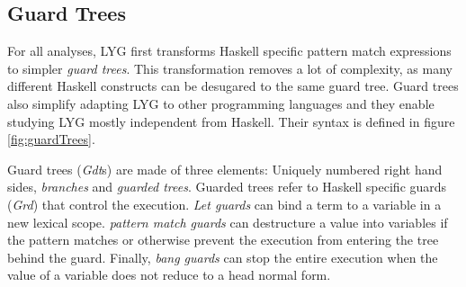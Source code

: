 \subsection{Guard Trees}

For all analyses, LYG first transforms Haskell specific pattern match expressions to simpler \textit{guard trees}.
This transformation removes a lot of complexity, as many different Haskell constructs can be desugared
to the same guard tree. Guard trees also simplify adapting LYG to other programming languages
and they enable studying LYG mostly independent from Haskell.
Their syntax is defined in figure \ref{fig:guardTrees}.

Guard trees (\textit{Gdt}s) are made of three elements: Uniquely numbered right hand sides, \textit{branches} and \textit{guarded trees}.
Guarded trees refer to Haskell specific guards (\textit{Grd}) that control the execution.
\textit{Let guards} can bind a term to a variable in a new lexical scope.
\textit{pattern match guards} can destructure a value into variables if the pattern matches or otherwise prevent the
execution from entering the tree behind the guard.
Finally, \textit{bang guards} can stop the entire execution when the value of a variable does not reduce to a head normal form.

